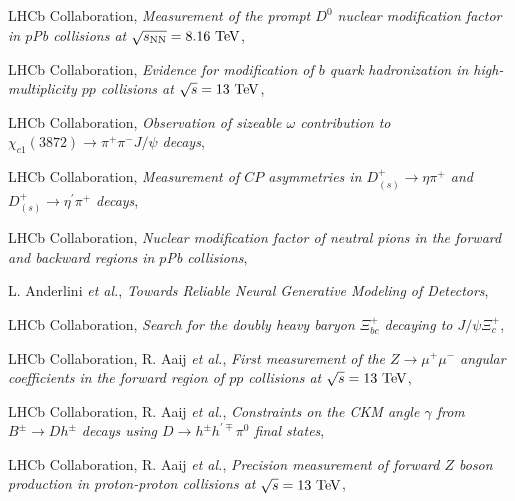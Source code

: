 \begin{cvcontent}
\begin{enumerate}[label={[\arabic*]}, leftmargin=1.5cm]
    \item LHCb Collaboration,
    \emph{Measurement of the prompt $D^0$ nuclear modification factor in $p$Pb collisions at $\sqrt{s_{\rm{NN}}} = 8.16~{\rm{TeV}}$},
    \item LHCb Collaboration,
    \emph{Evidence for modification of $b$ quark hadronization in high-multiplicity $pp$ collisions at $\sqrt{s} = 13~\rm{TeV}$},
    \item LHCb Collaboration,
    \emph{Observation of sizeable $\omega$ contribution to $\chi_{c1}(3872) \to \pi^+ \pi^- J/\psi$ decays},
    \item LHCb Collaboration,
    \emph{Measurement of $CP$ asymmetries in $D^+_{(s)}\rightarrow \eta \pi^+$ and $D^+_{(s)}\rightarrow \eta^{\prime} \pi^+$ decays},
    \item LHCb Collaboration,
    \emph{Nuclear modification factor of neutral pions in the forward and backward regions in $p$Pb collisions},
    \item L. Anderlini \emph{et al.},
    \emph{Towards Reliable Neural Generative Modeling of Detectors},
    \sloppy
    \item LHCb Collaboration,
    \emph{Search for the doubly heavy baryon $\Xi_{bc}^{+}$ decaying to $J/\psi \Xi_{c}^{+}$},
    \item LHCb Collaboration, R. Aaij \emph{et al.},
    \emph{First measurement of the $Z\rightarrow \mu^+ \mu^-$ angular coefficients in the forward region of $pp$ collisions at $\sqrt{s}=13~\rm{TeV}$},
    \item LHCb Collaboration, R. Aaij \emph{et al.}, 
    \emph{Constraints on the CKM angle $\gamma$ from $B^\pm \rightarrow Dh^\pm$ decays using $D \rightarrow h^\pm h^{\prime\mp}\pi^0$ final states},
    \item LHCb Collaboration, R. Aaij \emph{et al.}, 
    \emph{Precision measurement of forward $Z$ boson production in proton-proton collisions at $\sqrt{s} = 13~\rm{TeV}$},
  \end{enumerate}
  \vspace{3mm}
  \begin{enumerate}[label={[\arabic*]}, leftmargin=1.5cm]

\end{enumerate}
\end{cvcontent}
